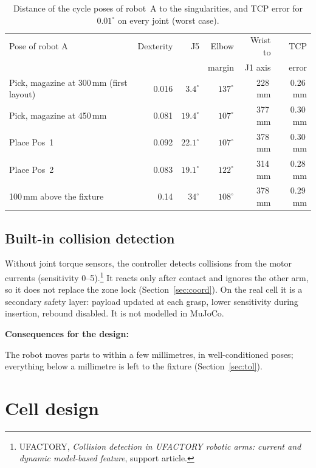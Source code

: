 \documentclass[11pt,a4paper]{article}
\begin{document}
\begin{table}[H]
\centering
\caption{Distance of the cycle poses of robot~A to the singularities, and TCP error for
$0.01^\circ$ on every joint (worst case).}
\label{tab:poses}
\small
\begin{tabular}{@{}lrrrrr@{}}
\toprule
Pose of robot A & Dexterity & J5 & Elbow & Wrist to & TCP\\
 & & & margin & J1 axis & error\\
\midrule
Pick, magazine at 300\,mm (first layout) & 0.016 & $3.4^\circ$ & $137^\circ$ & 228\,mm & 0.26\,mm\\
Pick, magazine at 450\,mm & 0.081 & $19.4^\circ$ & $107^\circ$ & 377\,mm & 0.30\,mm\\
Place Pos~1 & 0.092 & $22.1^\circ$ & $107^\circ$ & 378\,mm & 0.30\,mm\\
Place Pos~2 & 0.083 & $19.1^\circ$ & $122^\circ$ & 314\,mm & 0.28\,mm\\
100\,mm above the fixture & 0.14 & $34^\circ$ & $108^\circ$ & 378\,mm & 0.29\,mm\\
\bottomrule
\end{tabular}
\end{table}

\subsection{Built-in collision detection}

Without joint torque sensors, the controller detects collisions from the motor currents
(sensitivity 0--5).\footnote{UFACTORY, \emph{Collision detection in UFACTORY robotic arms:
		current and dynamic model-based feature}, support article.} It reacts only after contact and
ignores the other arm, so it does not replace the zone lock (Section~\ref{sec:coord}). On the
real cell it is a secondary safety layer: payload updated at each grasp, lower sensitivity
during insertion, rebound disabled. It is not modelled in MuJoCo.

\textbf{Consequences for the design:} 

The robot moves parts to within a few millimetres, in
well-conditioned poses; everything below a millimetre is left to the fixture
(Section~\ref{sec:tol}).\\

\section{Cell design}
\end{document}
